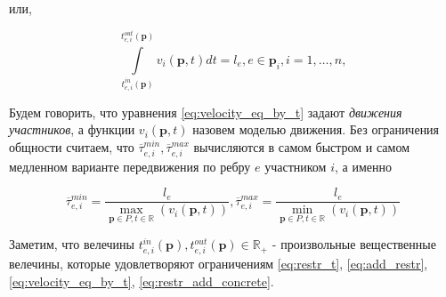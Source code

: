 \documentclass[12pt, a4paper]{article}
\begin{document}
или,

\begin{equation}
	\label{eq:velocity_eq_by_t}
	\int\limits_{t_{e, i}^{in}(\textbf{p})}^{t_{e, i}^{out}(\textbf{p})} v_i(\textbf{p}, t) dt = l_e, e \in \textbf{p}_i, i = 1, \dots, n,
\end{equation}

Будем говорить, что уравнения \eqref{eq:velocity_eq_by_t} задают \textit{движения участников}, а функции $v_i(\textbf{p}, t)$ назовем моделью движения. Без ограничения общности считаем, что $\overline{\tau}_{e, i}^{min}, \overline{\tau}_{e, i}^{max}$ вычисляются в самом быстром и самом медленном варианте передвижения по ребру $e$ участником $i$, а именно

\begin{equation}
	\label{eq:restr_add_concrete}
	\overline{\tau}_{e, i}^{min} = \frac{l_e}{\max\limits_{\textbf{p} \in P, t \in \mathbb{R}} \left(  v_i(\textbf{p}, t) \right)}, \overline{\tau}_{e, i}^{max} = \frac{l_e}{\min\limits_{\textbf{p} \in P, t \in \mathbb{R}} \left(  v_i(\textbf{p}, t) \right)}
\end{equation}

Заметим, что велечины $t_{e, i}^{in}(\textbf{p}), t_{e, i}^{out}(\textbf{p}) \in \mathbb{R}_+$ - произвольные вещественные велечины, которые удовлетворяют ограничениям \eqref{eq:restr_t}, \eqref{eq:add_restr}, \eqref{eq:velocity_eq_by_t}, \eqref{eq:restr_add_concrete}.
\end{document}

